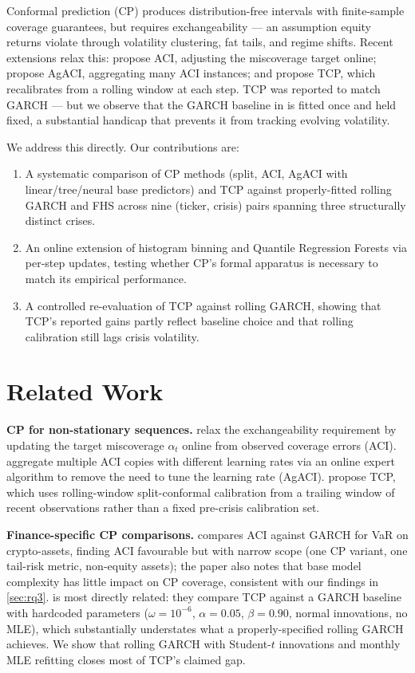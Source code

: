 \documentclass{article}
\begin{document}
Conformal prediction (CP) \citep{vovk2005} produces distribution-free intervals with finite-sample coverage guarantees, but requires exchangeability --- an assumption equity returns violate through volatility clustering, fat tails, and regime shifts. Recent extensions relax this: \citet{gibbs2021} propose ACI, adjusting the miscoverage target online; \citet{zaffran2022} propose AgACI, aggregating many ACI instances; and \citet{aich2026} propose TCP, which recalibrates from a rolling window at each step. TCP was reported to match GARCH --- but we observe that the GARCH baseline in \citet{aich2026} is fitted once and held fixed, a substantial handicap that prevents it from tracking evolving volatility.

We address this directly. Our contributions are:
\begin{enumerate}[nosep,leftmargin=*]
    \item A systematic comparison of CP methods (split, ACI, AgACI with linear/tree/neural base predictors) and TCP against properly-fitted rolling GARCH and FHS across nine (ticker, crisis) pairs spanning three structurally distinct crises.
    \item An online extension of histogram binning and Quantile Regression Forests via per-step updates, testing whether CP's formal apparatus is necessary to match its empirical performance.
    \item A controlled re-evaluation of TCP against rolling GARCH, showing that TCP's reported gains partly reflect baseline choice and that rolling calibration still lags crisis volatility.
\end{enumerate}

\section{Related Work}

\textbf{CP for non-stationary sequences.} \citet{gibbs2021} relax the exchangeability requirement by updating the target miscoverage \(\alpha_t\) online from observed coverage errors (ACI). \citet{zaffran2022} aggregate multiple ACI copies with different learning rates via an online expert algorithm to remove the need to tune the learning rate (AgACI). \citet{aich2026} propose TCP, which uses rolling-window split-conformal calibration from a trailing window of recent observations rather than a fixed pre-crisis calibration set.

\textbf{Finance-specific CP comparisons.} \citet{fantazzini2024} compares ACI against GARCH for VaR on crypto-assets, finding ACI favourable but with narrow scope (one CP variant, one tail-risk metric, non-equity assets); the paper also notes that base model complexity has little impact on CP coverage, consistent with our findings in \cref{sec:rq3}. \citet{aich2026} is most directly related: they compare TCP against a GARCH baseline with hardcoded parameters (\(\omega = 10^{-6}\), \(\alpha = 0.05\), \(\beta = 0.90\), normal innovations, no MLE), which substantially understates what a properly-specified rolling GARCH achieves. We show that rolling GARCH with Student-\(t\) innovations and monthly MLE refitting closes most of TCP's claimed gap.
\end{document}
